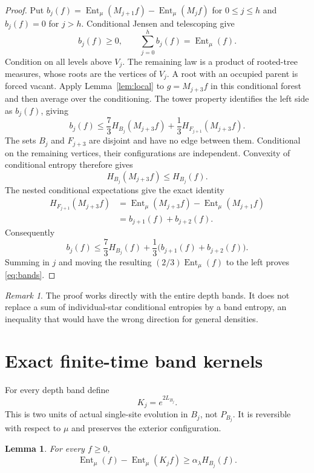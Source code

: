 \documentclass[11pt,reqno]{amsart}
\newtheorem{lemma}[theorem]{Lemma}
\theoremstyle{remark}
\newtheorem{remark}[theorem]{Remark}
\DeclareMathOperator{\Ent}{Ent}
\numberwithin{equation}{section}
\begin{document}
\begin{proof}
Put $b_j(f)=\Ent_\mu(M_{j+1}f)-\Ent_\mu(M_jf)$ for $0\le j\le h$ and $b_j(f)=0$ for $j>h$. Conditional Jensen and telescoping give
\[
 b_j(f)\ge0,\qquad \sum_{j=0}^h b_j(f)=\Ent_\mu(f).
\]
Condition on all levels above $V_j$. The remaining law is a product of rooted-tree measures, whose roots are the vertices of $V_j$. A root with an occupied parent is forced vacant. Apply Lemma~\ref{lem:local} to $g=M_{j+3}f$ in this conditional forest and then average over the conditioning. The tower property identifies the left side as $b_j(f)$, giving
\[
 b_j(f)\le\frac73 H_{B_j}(M_{j+3}f)
             +\frac13 H_{F_{j+1}}(M_{j+3}f).
\]
The sets $B_j$ and $F_{j+3}$ are disjoint and have no edge between them. Conditional on the remaining vertices, their configurations are independent. Convexity of conditional entropy therefore gives
\[
 H_{B_j}(M_{j+3}f)\le H_{B_j}(f).
\]
The nested conditional expectations give the exact identity
\begin{align*}
 H_{F_{j+1}}(M_{j+3}f)
 &=\Ent_\mu(M_{j+3}f)-\Ent_\mu(M_{j+1}f)\\
 &=b_{j+1}(f)+b_{j+2}(f).
\end{align*}
Consequently
\[
 b_j(f)\le\frac73 H_{B_j}(f)
       +\frac13\bigl(b_{j+1}(f)+b_{j+2}(f)\bigr).
\]
Summing in $j$ and moving the resulting $(2/3)\Ent_\mu(f)$ to the left proves \eqref{eq:bands}.
\end{proof}

\begin{remark}
The proof works directly with the entire depth bands. It does not replace a sum of individual-star conditional entropies by a band entropy, an inequality that would have the wrong direction for general densities.
\end{remark}

\section{Exact finite-time band kernels}

For every depth band define
\begin{equation}\label{eq:Kj}
 K_j=e^{2L_{B_j}}.
\end{equation}
This is two units of actual single-site evolution in $B_j$, not $P_{B_j}$. It is reversible with respect to $\mu$ and preserves the exterior configuration.

\begin{lemma}\label{lem:band-drop}
For every $f\ge0$,
\begin{equation}\label{eq:band-drop}
 \Ent_\mu(f)-\Ent_\mu(K_jf)\ge\alpha_\lambda H_{B_j}(f).
\end{equation}
\end{lemma}
\end{document}

